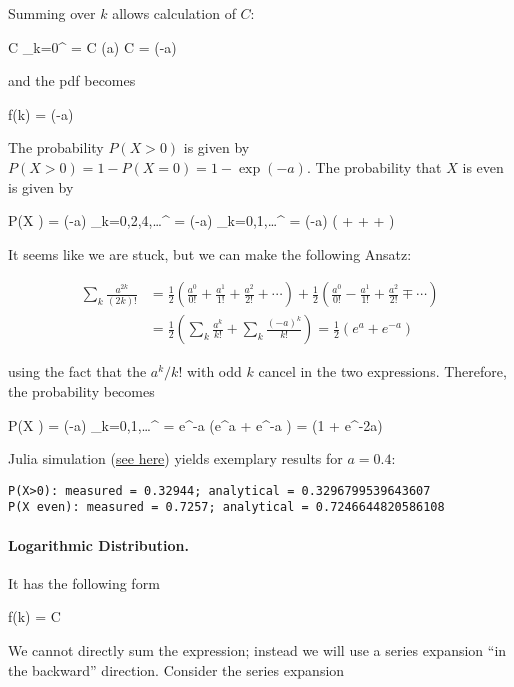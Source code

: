 Summing over $k$ allows calculation of $C$:

\bee
C \sum_{k=0}^\infty {} = C \exp(a)  \rightarrow C = \exp(-a)
\eee

and the pdf becomes

\bee
f(k) = \exp(-a) 
\eee

The probability $P(X > 0)$ is given by $P(X>0) = 1 - P(X=0) = 1-\exp(-a)$. The probability that $X$ is even is given by

\bee
P(X ) = \exp(-a) \sum_{k=0,2,4,\ldots}^\infty {} = \exp(-a) \sum_{k=0,1,\ldots}^\infty {} = \exp(-a) \left(  +  +  + \cdots \right)
\eee

It seems like we are stuck, but we can make the following Ansatz:

\begin{align*}
\sum_k \frac{a^{2k}}{(2k)!} &= \frac{1}{2} \left(\frac{a^0}{0!} + \frac{a^1}{1!} + \frac{a^2}{2!} + \cdots \right) + \frac{1}{2} \left(\frac{a^0}{0!} - \frac{a^1}{1!} + \frac{a^2}{2!} \mp \cdots \right) \\ &= \frac{1}{2} \left( \sum_k \frac{a^k}{k!} + \sum_k \frac{(-a)^k}{k!} \right) = \frac{1}{2} \left(e^a + e^{-a} \right)
\end{align*}

using the fact that the $a^k/k!$ with odd $k$ cancel in the two expressions. Therefore, the probability becomes

\bee
P(X ) = \exp(-a) \sum_{k=0,1,\ldots}^\infty {} =  e^{-a} \left(e^a + e^{-a} \right) =  (1 + e^{-2a})
\eee

Julia simulation (\href{https://github.com/ClemensFMN/JuliaStuff/blob/master/stochastic/poisson_rv.jl}{see here}) yields exemplary results for $a=0.4$:

\begin{verbatim}
P(X>0): measured = 0.32944; analytical = 0.3296799539643607
P(X even): measured = 0.7257; analytical = 0.7246644820586108
\end{verbatim}


\paragraph{Logarithmic Distribution.} It has the following form

\bee
f(k) = C 
\eee

We cannot directly sum the expression; instead we will use a series expansion ``in the backward'' direction. Consider the series expansion

